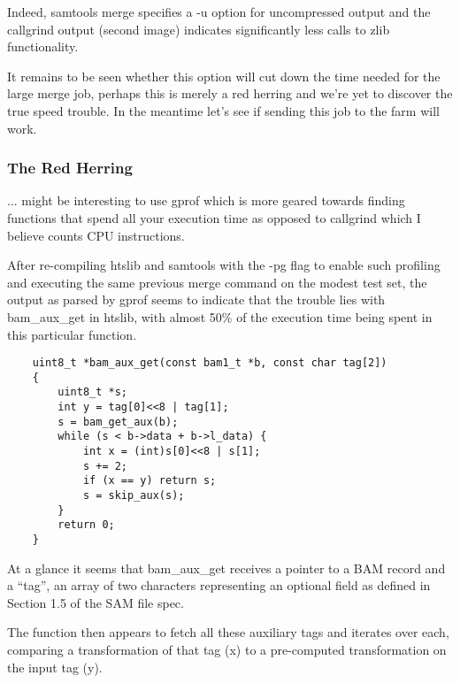 Indeed, samtools merge specifies a -u option for uncompressed output and the
callgrind output (second image) indicates significantly less calls to zlib
functionality.

It remains to be seen whether this option will cut down the time needed for the
large merge job, perhaps this is merely a red herring and we’re yet to discover
the true speed trouble. In the meantime let’s see if sending this job to the
farm will work.


\subsubsection{The Red Herring}

... might be interesting to use gprof which is more
geared towards finding functions that spend all your execution time as opposed
to callgrind which I believe counts CPU instructions.

After re-compiling htslib and samtools with the -pg flag to enable such
profiling and executing the same previous merge command on the modest test set,
the output as parsed by gprof seems to indicate that the trouble lies with
bam\_aux\_get in htslib, with almost 50\% of the execution time being spent in
this particular function.

\begin{verbatim}
    uint8_t *bam_aux_get(const bam1_t *b, const char tag[2])
    {
        uint8_t *s;
        int y = tag[0]<<8 | tag[1];
        s = bam_get_aux(b);
        while (s < b->data + b->l_data) {
            int x = (int)s[0]<<8 | s[1];
            s += 2;
            if (x == y) return s;
            s = skip_aux(s);
        }
        return 0;
    }
\end{verbatim}


At a glance it seems that bam\_aux\_get receives a pointer to a BAM record and a
“tag”, an array of two characters representing an optional field as defined in
Section 1.5 of the SAM file spec.

The function then appears to fetch all these auxiliary tags and iterates over
each, comparing a transformation of that tag (x) to a pre-computed
transformation on the input tag (y).

